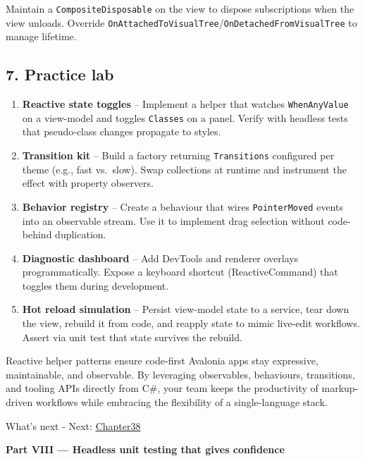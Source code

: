 Maintain a \passthrough{\lstinline!CompositeDisposable!} on the view to
dispose subscriptions when the view unloads. Override
\passthrough{\lstinline!OnAttachedToVisualTree!}/\passthrough{\lstinline!OnDetachedFromVisualTree!}
to manage lifetime.

\subsection{7. Practice lab}\label{practice-lab-4}

\begin{enumerate}
\def\labelenumi{\arabic{enumi}.}
\tightlist
\item
  \textbf{Reactive state toggles} -- Implement a helper that watches
  \passthrough{\lstinline!WhenAnyValue!} on a view-model and toggles
  \passthrough{\lstinline!Classes!} on a panel. Verify with headless
  tests that pseudo-class changes propagate to styles.
\item
  \textbf{Transition kit} -- Build a factory returning
  \passthrough{\lstinline!Transitions!} configured per theme (e.g., fast
  vs.~slow). Swap collections at runtime and instrument the effect with
  property observers.
\item
  \textbf{Behavior registry} -- Create a behaviour that wires
  \passthrough{\lstinline!PointerMoved!} events into an observable
  stream. Use it to implement drag selection without code-behind
  duplication.
\item
  \textbf{Diagnostic dashboard} -- Add DevTools and renderer overlays
  programmatically. Expose a keyboard shortcut (ReactiveCommand) that
  toggles them during development.
\item
  \textbf{Hot reload simulation} -- Persist view-model state to a
  service, tear down the view, rebuild it from code, and reapply state
  to mimic live-edit workflows. Assert via unit test that state survives
  the rebuild.
\end{enumerate}

Reactive helper patterns ensure code-first Avalonia apps stay
expressive, maintainable, and observable. By leveraging observables,
behaviours, transitions, and tooling APIs directly from C\#, your team
keeps the productivity of markup-driven workflows while embracing the
flexibility of a single-language stack.

What's next - Next: \href{Chapter38.md}{Chapter38}

\clearpage
{}
{}
\thispagestyle{empty}
\vspace*{\fill}
\begin{center}
{\Huge\bfseries Part VIII — Headless unit testing that gives confidence}
\end{center}
\vspace*{\fill}
\clearpage

